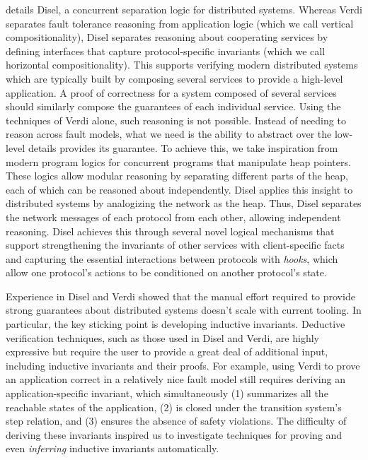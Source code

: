  details Disel, a concurrent separation logic for distributed
systems.  Whereas Verdi separates fault tolerance reasoning from
application logic (which we call vertical compositionality), Disel
separates reasoning about cooperating services by defining interfaces
that capture protocol-specific invariants (which we call horizontal
compositionality).  This supports verifying modern distributed systems
which are typically built by composing several services to provide a
high-level application.  A proof of correctness for a system composed
of several services should similarly compose the guarantees of each
individual service. Using the techniques of Verdi alone, such reasoning
is not possible. Instead of needing to reason across fault models,
what we need is the ability to abstract over the low-level details
provides its guarantee. To achieve this, we take inspiration from
modern program logics for concurrent programs that manipulate
heap pointers. These logics allow modular reasoning by separating
different parts of the heap, each of which can be reasoned about
independently. Disel applies this insight to distributed systems
by analogizing the network as the heap. Thus, Disel separates
the network messages of each protocol from each other, allowing
independent reasoning. Disel achieves this through several
novel logical mechanisms that support strengthening the invariants
of other services with client-specific facts and capturing the
essential interactions between protocols with \emph{hooks}, which
allow one protocol's actions to be conditioned on another protocol's
state.

Experience in Disel and Verdi showed that the manual effort required
to provide strong guarantees about distributed systems doesn't scale
with current tooling.  In particular, the key sticking point is
developing inductive invariants.  Deductive verification techniques,
such as those used in Disel and Verdi, are highly expressive but
require the user to provide a great deal of additional input,
including inductive invariants and their proofs. For example, using
Verdi to prove an application correct in a relatively nice fault model
still requires deriving an application-specific invariant, which
simultaneously (1) summarizes all the reachable states of the
application, (2) is closed under the transition system's step
relation, and (3) ensures the absence of safety violations.
The difficulty of deriving these invariants inspired us to
investigate techniques for proving and even \emph{inferring}
inductive invariants automatically.

